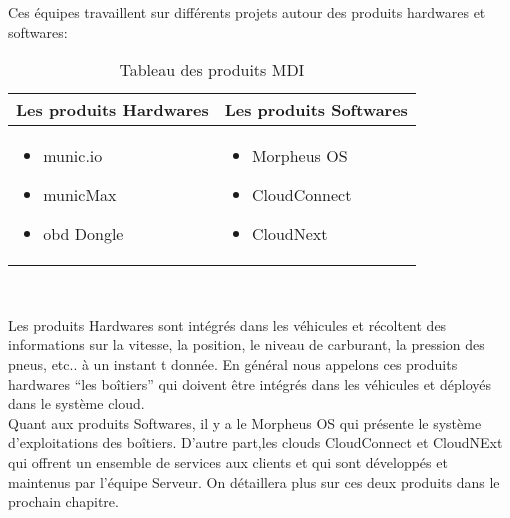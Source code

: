         Ces équipes travaillent sur différents projets autour des produits hardwares et softwares: 
            \begin{table}[h!]
                \centering
                \begin{tabular}{|p{5cm}|p{5cm}|}
                    \hline   Les produits Hardwares & Les produits Softwares \\
                    \hline
                    \begin{itemize}
                        \renewcommand{\labelitemi}{$\bullet$}
                        \item munic.io
                        \item municMax
                        \item \gls{obd} Dongle
                    \end{itemize} 
                   & 
                    \begin{itemize}
                        \renewcommand{\labelitemi}{$\bullet$}
                        \item Morpheus OS
                        \item CloudConnect
                        \item CloudNext
                    \end{itemize}\\
                    \hline 
                \end{tabular}
                \caption{Tableau des produits MDI}
                \label{table:1}
            \end{table} \\

            \vspace{0.3cm}

            Les produits Hardwares sont intégrés dans les véhicules et récoltent des informations sur 
            la vitesse, la position, le niveau de carburant, la pression des pneus, etc..  à un instant t donnée.
            En général nous appelons ces produits hardwares “les boîtiers” qui doivent être intégrés dans 
            les véhicules et déployés  dans le système cloud. \\ [0.1cm]
            Quant aux produits Softwares, il y a le Morpheus OS qui présente le système d'exploitations des boîtiers. 
            D'autre part,les clouds CloudConnect et CloudNExt qui offrent un ensemble de services aux clients 
            et qui sont développés et maintenus par l'équipe Serveur. On détaillera plus sur ces deux produits dans le prochain chapitre. 
       
